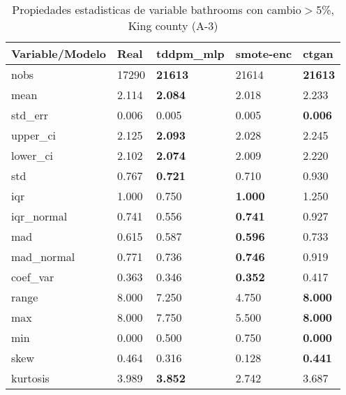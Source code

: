 \begin{table}[H]
\centering
\fontsize{8}{14}\selectfont
\caption{Propiedades estadisticas de variable bathrooms con cambio\ensuremath{>}5\%, King county (A-3)}
\label{table-stats-king county-a-3-bathrooms-short}
\begin{tabular}{|l|m{10em}|m{10em}|m{10em}|m{10em}|}
\hline
 \rowcolor[gray]{0.8}
Variable/Modelo & Real & tddpm\_mlp & smote-enc & ctgan \\
\hline nobs & 17290 & \bfseries 21613 & \cellcolor[rgb]{0.9, 0.54, 0.52} 21614 & \bfseries 21613 \\
\hline mean & 2.114 & \bfseries 2.084 & 2.018 & \cellcolor[rgb]{0.9, 0.54, 0.52} 2.233 \\
\hline std\_err & 0.006 & 0.005 & \cellcolor[rgb]{0.9, 0.54, 0.52} 0.005 & \bfseries 0.006 \\
\hline upper\_ci & 2.125 & \bfseries 2.093 & 2.028 & \cellcolor[rgb]{0.9, 0.54, 0.52} 2.245 \\
\hline lower\_ci & 2.102 & \bfseries 2.074 & 2.009 & \cellcolor[rgb]{0.9, 0.54, 0.52} 2.220 \\
\hline std & 0.767 & \bfseries 0.721 & 0.710 & \cellcolor[rgb]{0.9, 0.54, 0.52} 0.930 \\
\hline iqr & 1.000 & \cellcolor[rgb]{0.9, 0.54, 0.52} 0.750 & \bfseries 1.000 & \cellcolor[rgb]{0.9, 0.54, 0.52} 1.250 \\
\hline iqr\_normal & 0.741 & \cellcolor[rgb]{0.9, 0.54, 0.52} 0.556 & \bfseries 0.741 & \cellcolor[rgb]{0.9, 0.54, 0.52} 0.927 \\
\hline mad & 0.615 & 0.587 & \bfseries 0.596 & \cellcolor[rgb]{0.9, 0.54, 0.52} 0.733 \\
\hline mad\_normal & 0.771 & 0.736 & \bfseries 0.746 & \cellcolor[rgb]{0.9, 0.54, 0.52} 0.919 \\
\hline coef\_var & 0.363 & 0.346 & \bfseries 0.352 & \cellcolor[rgb]{0.9, 0.54, 0.52} 0.417 \\
\hline range & 8.000 & 7.250 & \cellcolor[rgb]{0.9, 0.54, 0.52} 4.750 & \bfseries 8.000 \\
\hline max & 8.000 & 7.750 & \cellcolor[rgb]{0.9, 0.54, 0.52} 5.500 & \bfseries 8.000 \\
\hline min & 0.000 & 0.500 & \cellcolor[rgb]{0.9, 0.54, 0.52} 0.750 & \bfseries 0.000 \\
\hline skew & 0.464 & 0.316 & \cellcolor[rgb]{0.9, 0.54, 0.52} 0.128 & \bfseries 0.441 \\
\hline kurtosis & 3.989 & \bfseries 3.852 & \cellcolor[rgb]{0.9, 0.54, 0.52} 2.742 & 3.687 \\

\end{tabular}
\end{table}

